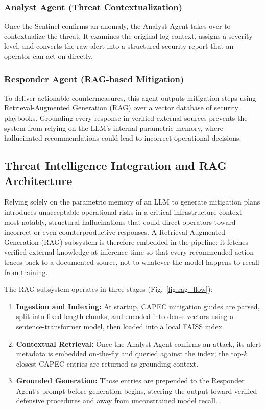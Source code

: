 \documentclass[conference]{IEEEtran}
\begin{document}
\subsubsection{Analyst Agent (Threat Contextualization)}
Once the Sentinel confirms an anomaly, the Analyst Agent takes over to contextualize the threat. It examines the original log context, assigns a severity level, and converts the raw alert into a structured security report that an operator can act on directly.

\subsubsection{Responder Agent (RAG-based Mitigation)}
To deliver actionable countermeasures, this agent outputs mitigation steps using Retrieval-Augmented Generation (RAG) over a vector database of security playbooks. Grounding every response in verified external sources prevents the system from relying on the LLM's internal parametric memory, where hallucinated recommendations could lead to incorrect operational decisions.

\subsection{Threat Intelligence Integration and RAG Architecture}
\label{subsec:rag_arch}
Relying solely on the parametric memory of an LLM to generate mitigation plans introduces unacceptable operational risks in a critical infrastructure context---most notably, structural hallucinations that could direct operators toward incorrect or even counterproductive responses. A Retrieval-Augmented Generation (RAG) subsystem is therefore embedded in the pipeline: it fetches verified external knowledge at inference time so that every recommended action traces back to a documented source, not to whatever the model happens to recall from training.

The RAG subsystem operates in three stages (Fig.~\ref{fig:rag_flow}):
\begin{enumerate}
    \item \textbf{Ingestion and Indexing:} At startup, CAPEC mitigation guides are parsed, split into fixed-length chunks, and encoded into dense vectors using a sentence-transformer model, then loaded into a local FAISS index.
    \item \textbf{Contextual Retrieval:} Once the Analyst Agent confirms an attack, its alert metadata is embedded on-the-fly and queried against the index; the top-$k$ closest CAPEC entries are returned as grounding context.
    \item \textbf{Grounded Generation:} Those entries are prepended to the Responder Agent's prompt before generation begins, steering the output toward verified defensive procedures and away from unconstrained model recall.
\end{enumerate}
\end{document}
